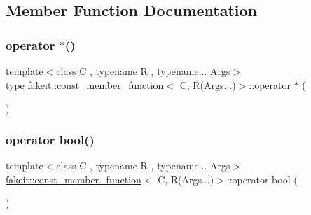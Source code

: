 \subsection{Member Function Documentation}
\mbox{\label{classfakeit_1_1const__member__function_3_01C_00_01R_07Args_8_8_8_08_4_a4106166e8bd9b9c529bc6ee3194c5b1b}} 
\subsubsection{\texorpdfstring{operator $\ast$()}{operator *()}}
{\footnotesize\ttfamily template$<$class C , typename R , typename... Args$>$ \\
\mbox{\hyperlink{classfakeit_1_1const__member__function_3_01C_00_01R_07Args_8_8_8_08_4_ab962f803e5a8b5b2078ee8674900288c}{type}} \mbox{\hyperlink{classfakeit_1_1const__member__function}{fakeit\+::const\+\_\+member\+\_\+function}}$<$ C, R(Args...)$>$\+::operator $\ast$ (\begin{DoxyParamCaption}{ }\end{DoxyParamCaption})\hspace{0.3cm}{\ttfamily [inline]}}

\mbox{\label{classfakeit_1_1const__member__function_3_01C_00_01R_07Args_8_8_8_08_4_ab26036f9b05acc42a37f3f0a31b6c1c2}} 
\subsubsection{\texorpdfstring{operator bool()}{operator bool()}}
{\footnotesize\ttfamily template$<$class C , typename R , typename... Args$>$ \\
\mbox{\hyperlink{classfakeit_1_1const__member__function}{fakeit\+::const\+\_\+member\+\_\+function}}$<$ C, R(Args...)$>$\+::operator bool (\begin{DoxyParamCaption}{ }\end{DoxyParamCaption})\hspace{0.3cm}{\ttfamily [inline]}}

